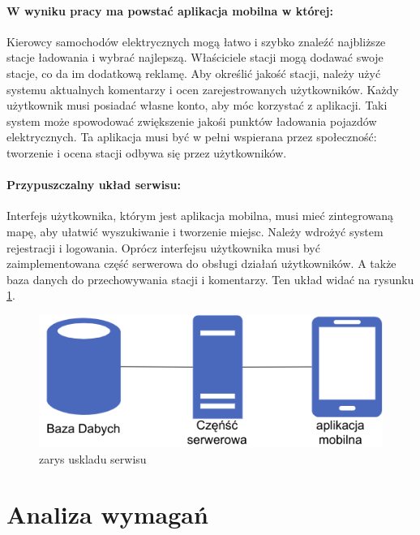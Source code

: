 \paragraph{W wyniku pracy ma powstać aplikacja mobilna w której:}
Kierowcy samochodów elektrycznych mogą łatwo i szybko znaleźć najbliższe stacje ładowania i wybrać najlepszą.
Właściciele stacji mogą dodawać swoje stacje, co da im dodatkową reklamę.
Aby określić jakość stacji, należy użyć systemu aktualnych komentarzy i ocen zarejestrowanych użytkowników.
Każdy użytkownik musi posiadać własne konto, aby móc korzystać z aplikacji.
Taki system może spowodować zwiększenie jakośi punktów ładowania pojazdów elektrycznych.
Ta aplikacja musi być w pełni wspierana przez społeczność: tworzenie i ocena stacji odbywa się przez użytkowników.

\paragraph{Przypuszczalny układ serwisu:}
Interfejs użytkownika, którym jest aplikacja mobilna, musi mieć zintegrowaną mapę, aby ułatwić wyszukiwanie i tworzenie miejsc.
Należy wdrożyć system rejestracji i logowania.
Oprócz interfejsu użytkownika musi być zaimplementowana część serwerowa do obsługi działań użytkowników.
A także baza danych do przechowywania stacji i komentarzy. Ten układ widać na rysunku \ref{fig:zarysuskladuserwisu}.
\begin{figure}[ht]
    \centering
        \includegraphics[width=0.4\linewidth]{rys02/uklad_wstepny.png}
        \caption{zarys uskladu serwisu \cite{diagrams_net}}
    \label{fig:zarysuskladuserwisu}
\end{figure}\newline
\newpage
\section{Analiza wymagań}
